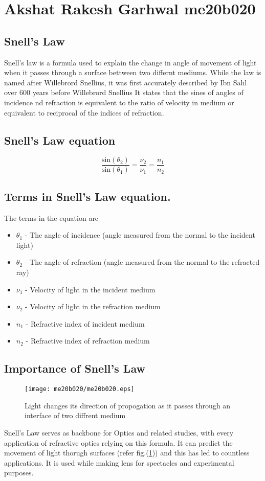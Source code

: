 \section{Akshat Rakesh Garhwal me20b020}
\subsection{Snell's Law}
Snell's law is a formula used to explain the change in angle of movement of light when it passes through a surface bettween two differnt mediums.
While the law is named after Willebrord Snellius, it was first accurately described by Ibn Sahl over 600 years before Willebrord Snellius
It states that the sines of angles of incidence nd refraction is equivalent to the ratio of velocity in medium or equivalent to reciprocal of the indices of refraction.
\subsection{Snell's Law equation}
\begin{equation}
	\frac {\text{sin}(\theta_{2})}{\text{sin}(\theta_{1})}  = \frac {\nu_{2}}{\nu_{1}} = {\frac  {n_{1}}{n_{2}}}
\end{equation}
\subsection{Terms in Snell's Law equation.}
The terms in the equation are 
\begin{itemize}
\item $\theta_{1}$ - The angle of incidence (angle measured from the normal to the incident light) 
\item $\theta_{2}$ - The angle of refraction (angle measured from the normal to the refracted ray)
\item $\nu_{1}$ - Velocity of light in the incident medium
\item $\nu_{2}$ - Velocity of light in the refraction medium
\item $n_{1}$ - Refractive index of incident medium
\item $n_{2}$ - Refractive index of refraction medium
\end{itemize}
\subsection{Importance of Snell's Law}
\begin{figure}[h]
\centering
\texttt{[image: me20b020/me20b020.eps]}
\caption{Light changes its direction of propogation as it passes through an interface of two diffrent medium}
\label{fig:lightpropogation}
\end{figure}
Snell's Law serves as backbone for Optics and related studies, with every application of refractive optics relying on this formula. It can predict the movement of light thorugh surfaces (refer fig.(\ref{fig:lightpropogation})) and this has led to countless applications. It is used while making lens for spectacles and experimental purposes. 